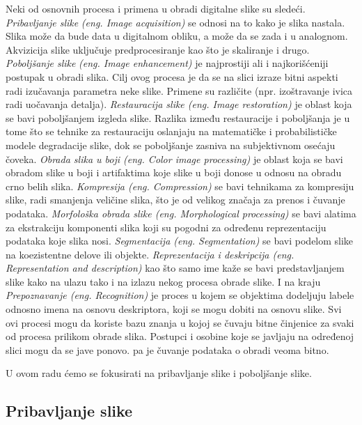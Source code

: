 \documentclass[a4paper,12pt,titlepage]{article}
\begin{document}
Neki od osnovnih procesa i primena u obradi digitalne slike su sledeći. \emph{Pribavljanje slike} \emph{(eng. Image acquisition)} se odnosi na to kako je slika nastala. Slika može da bude data u digitalnom obliku, a može da se zada i u analognom. Akvizicija slike uključuje predprocesiranje kao što je skaliranje i drugo. \emph{Poboljšanje slike} \emph{(eng. Image enhancement)} je najprostiji ali i najkorišćeniji postupak u obradi slika. Cilj ovog procesa je da se na slici izraze bitni aspekti radi izučavanja parametra neke slike. Primene su različite (npr. izoštravanje ivica radi uočavanja detalja). \emph{Restauracija slike (eng. Image restoration)} je oblast koja se bavi poboljšanjem izgleda slike. Razlika između restauracije i poboljšanja je u tome što se tehnike za restauraciju oslanjaju na matematičke i probabilističke modele degradacije slike, dok se poboljšanje zasniva na subjektivnom osećaju čoveka. \emph{Obrada slika u boji (eng. Color image processing)} je oblast koja se bavi obradom slike u boji i artifaktima koje slike u boji donose u odnosu na obradu crno belih slika. \emph{Kompresija (eng. Compression)} se bavi tehnikama za kompresiju slike, radi smanjenja veličine slika, što je od velikog značaja za prenos i čuvanje podataka. \emph{Morfološka obrada slike (eng. Morphological processing)} se bavi alatima za ekstrakciju komponenti slika koji su pogodni za određenu reprezentaciju podataka koje slika nosi. \emph{Segmentacija (eng. Segmentation)} se bavi podelom slike na koezistentne delove ili objekte. \emph{Reprezentacija i deskripcija (eng. Representation and description)} kao što samo ime kaže se bavi predstavljanjem slike kako na ulazu tako i na izlazu nekog procesa obrade slike. I na kraju \emph{Prepoznavanje (eng. Recognition)} je proces u kojem se objektima dodeljuju labele odnosno imena na osnovu deskriptora, koji se mogu dobiti na osnovu slike. Svi ovi procesi mogu da koriste bazu znanja u kojoj se čuvaju bitne činjenice za svaki od procesa prilikom obrade slika. Postupci i osobine koje se javljaju na određenoj slici mogu da se jave ponovo. pa je čuvanje podataka o obradi veoma bitno.

U ovom radu ćemo se fokusirati na pribavljanje slike i poboljšanje slike.

\subsection{Pribavljanje slike}%
\end{document}
